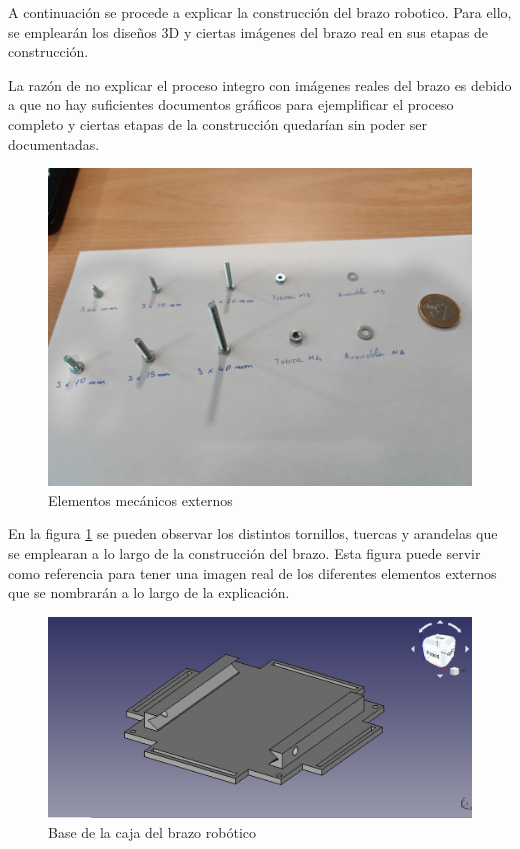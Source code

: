 A continuación se procede a explicar la construcción del brazo robotico. Para ello, se emplearán los diseños 3D y ciertas imágenes del brazo real en sus etapas de construcción.

La razón de no explicar el proceso integro con imágenes reales del brazo es debido a que no hay suficientes documentos gráficos para ejemplificar el proceso completo y ciertas etapas de la construcción quedarían sin poder ser documentadas.

\begin{figure}[H]
    \centering 
    \includegraphics[width=1\linewidth]{pictures/ElementosMecanicosExternos.jpg}
    \caption{Elementos mecánicos externos}
    \label{fig:elementos_mecanicos_externos}
\end{figure}

En la figura \ref{fig:elementos_mecanicos_externos} se pueden observar los distintos tornillos, tuercas y arandelas que se emplearan a lo largo de la construcción del brazo. Esta figura puede servir como referencia para tener una imagen real de los diferentes elementos externos que se nombrarán a lo largo de la explicación.

\begin{figure}[H]
    \centering 
    \includegraphics[width=1\linewidth]{pictures/BaseDelBrazoRobotico.png}
    \caption{Base de la caja del brazo robótico}
    \label{fig:base_caja_brazo_robotico}
\end{figure}

